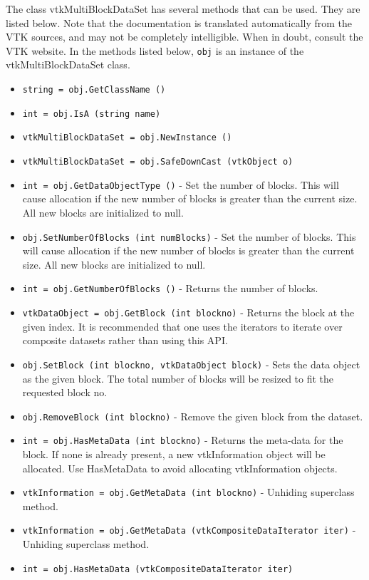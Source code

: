 The class vtkMultiBlockDataSet has several methods that can be used.
  They are listed below.
Note that the documentation is translated automatically from the VTK sources,
and may not be completely intelligible.  When in doubt, consult the VTK website.
In the methods listed below, \verb|obj| is an instance of the vtkMultiBlockDataSet class.
\begin{itemize}
\item  \verb|string = obj.GetClassName ()|

\item  \verb|int = obj.IsA (string name)|

\item  \verb|vtkMultiBlockDataSet = obj.NewInstance ()|

\item  \verb|vtkMultiBlockDataSet = obj.SafeDownCast (vtkObject o)|

\item  \verb|int = obj.GetDataObjectType ()| -  Set the number of blocks. This will cause allocation if the new number of
 blocks is greater than the current size. All new blocks are initialized to
 null.

\item  \verb|obj.SetNumberOfBlocks (int numBlocks)| -  Set the number of blocks. This will cause allocation if the new number of
 blocks is greater than the current size. All new blocks are initialized to
 null.

\item  \verb|int = obj.GetNumberOfBlocks ()| -  Returns the number of blocks.

\item  \verb|vtkDataObject = obj.GetBlock (int blockno)| -  Returns the block at the given index. It is recommended that one uses the
 iterators to iterate over composite datasets rather than using this API.

\item  \verb|obj.SetBlock (int blockno, vtkDataObject block)| -  Sets the data object as the given block. The total number of blocks will 
 be resized to fit the requested block no.

\item  \verb|obj.RemoveBlock (int blockno)| -  Remove the given block from the dataset.

\item  \verb|int = obj.HasMetaData (int blockno)| -  Returns the meta-data for the block. If none is already present, a new
 vtkInformation object will be allocated. Use HasMetaData to avoid
 allocating vtkInformation objects.

\item  \verb|vtkInformation = obj.GetMetaData (int blockno)| -  Unhiding superclass method.

\item  \verb|vtkInformation = obj.GetMetaData (vtkCompositeDataIterator iter)| -  Unhiding superclass method.

\item  \verb|int = obj.HasMetaData (vtkCompositeDataIterator iter)|

\end{itemize}
